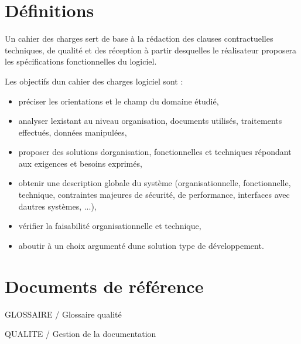 \documentclass{mise_en_page}
\begin{document}
\maketitle

\begin{historique}
\end{historique}

\newpage

\tableofcontents

\section[Définitions]{Définitions}
Un cahier des charges sert de base à la rédaction des clauses
contractuelles techniques, de qualité et des réception à partir
desquelles le réalisateur proposera les spécifications fonctionnelles
du logiciel.

Les objectifs d{\textquotesingle}un cahier des charges logiciel sont :

\begin{itemize}
\item préciser les orientations et le champ du domaine étudié,
\item analyser l{\textquotesingle}existant au niveau organisation,
documents utilisés, traitements effectués, données manipulées,
\item proposer des solutions d{\textquotesingle}organisation,
fonctionnelles et techniques répondant aux exigences et besoins
exprimés,
\item obtenir une description globale du système (organisationnelle,
fonctionnelle, technique, contraintes majeures de sécurité, de
performance, interfaces avec d{\textquotesingle}autres systèmes, ...),
\item vérifier la faisabilité organisationnelle et technique,
\item aboutir à un choix argumenté d{\textquotesingle}une solution type
de développement.
\end{itemize}


\section[Documents de référence]{Documents de référence}
GLOSSAIRE / Glossaire qualité

QUALITE / Gestion de la documentation
\end{document}
